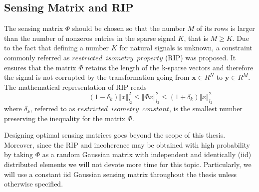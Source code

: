 \FloatBarrier

\subsection{Sensing Matrix and RIP}
The sensing matrix $\Phi$ should be chosen so that the number $M$ of its rows is larger than the number of nonzeros entries in the sparse signal $K$, that is $M \geq K$. Due to the fact that defining a number $K$ for natural signals is unknown, a constraint commonly referred as $restricted \enspace isometry \enspace property$ (RIP) \cite{candes2005decoding,candes2006stable,candes2008restricted} was proposed. It ensures that the matrix $\Phi$ retains the length of the k-sparse vectors and therefore the signal is not corrupted  by the transformation going from $\mathbf{x} \in R^N $ to $\mathbf{y} \in R^M $. The mathematical representation of RIP reads
\begin{equation} \label{eq:rip1}
\hspace{3em} \hspace{3em} \hspace{3em} (1-\delta_k)\Vert x \Vert_{l_2}^2 \leq \Vert \Phi x \Vert_{l_2}^2 \leq (1+\delta_k)\Vert x \Vert_{l_2}^2  \hspace{3em}
\end{equation}  
where $\delta_k$, referred to as $restricted \enspace isometry \enspace constant$, is the smallest number preserving the inequality for the matrix $\Phi$. \

Designing optimal sensing matrices goes beyond the scope of this thesis. Moreover, since the RIP and incoherence may be obtained with high probability by taking $\Phi$ as a random Gaussian matrix with independent and identically (iid) distributed elements\cite{candes2005signal} we will not devote more time for this topic. Particularly, we will use a constant iid Gaussian sensing matrix throughout the thesis unless otherwise specified.   

\FloatBarrier      

